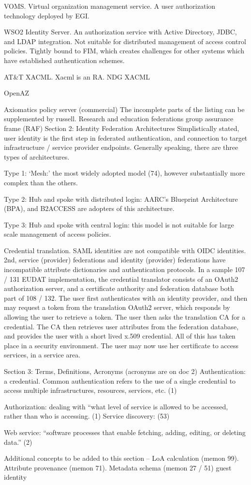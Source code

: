 VOMS. Virtual organization management service. A user authorization
technology deployed by EGI.

WSO2 Identity Server. An authorization service with Active Directory,
JDBC, and LDAP integration. Not suitable for distributed management of
access control policies. Tightly bound to FIM, which creates
challenges for other systems which have established authentication
schemes.

AT&T XACML. Xacml is an RA. NDG XACML

OpenAZ 

Axiomatics policy server (commercial) The incomplete parts of the
listing can be supplemented by russell.  Research and education
federations group assurance frame (RAF) Section 2: Identity Federation
Architectures Simplistically stated, user identity is the first step
in federated authentication, and connection to target infrastructure /
service provider endpoints. Generally speaking, there are three types
of architectures.

Type 1: ‘Mesh:’ the most widely adopted model (74), however
substantially more complex than the others.

Type 2: Hub and spoke with distributed login: AARC’s Blueprint
Architecture (BPA), and B2ACCESS are adopters of this architecture.

Type 3: Hub and spoke with central login: this model is not suitable
for large scale management of access policies.

Credential translation. SAML identities are not compatible with OIDC
identities. 2nd, service (provider) federations and identity
(provider) federations have incompatible attribute dictionaries and
authentication protocols. In a sample 107 / 131 EUDAT implementation,
the credential translator consists of an OAuth2 authorization server,
and a certificate authority and federation database both part of 108 /
132. The user first authenticates with an identity provider, and then
may request a token from the translation OAuth2 server, which responds
by allowing the user to retrieve a token. The user then asks the
translation CA for a credential. The CA then retrieves user attributes
from the federation database, and provides the user with a short lived
x.509 credential. All of this has taken place in a security
environment. The user may now use her certificate to access services,
in a service area.

Section 3: Terms, Definitions, Acronyms (acronyms are on doc 2)
Authentication: a credential. Common authentication refers to the use
of a single credential to access multiple infrastructures, resources,
services, etc. (1)

Authorization: dealing with “what level of service is allowed to be
accessed, rather than who is accessing. (1) Service discovery: (53)

Web service: “software processes that enable fetching, adding,
editing, or deleting data.” (2)

Additional concepts to be added to this section – 
LoA calculation
(memon 99). Attribute provenance
(memon 71). Metadata schema
(memon 27 / 51) guest identity



